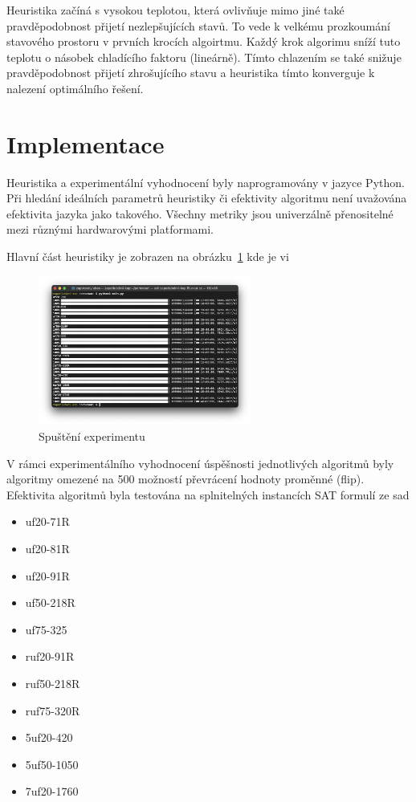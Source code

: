 \documentclass[twoside,twocolumn]{article}
\begin{document}
    Heuristika začíná s vysokou teplotou, která ovlivňuje mimo jiné také pravděpodobnost přijetí nezlepšujících stavů.
    To vede k velkému prozkoumání stavového prostoru v prvních krocích algoirtmu.
    Každý krok algorimu sníží tuto teplotu o násobek chladícího faktoru (lineárně).
    Tímto chlazením se také snižuje pravděpodobnost přijetí zhrošujícího stavu a heuristika tímto konverguje k nalezení
    optimálního řešení.



    \section{Implementace}

    Heuristika a experimentální vyhodnocení byly naprogramovány v jazyce Python.
    Při hledání ideálních parametrů heuristiky či efektivity algoritmu není uvažována efektivita jazyka jako takového.
    Všechny metriky jsou univerzálně přenositelné mezi různými hardwarovými platformami.

    Hlavní část heuristiky je zobrazen na obrázku~\ref{fig:main-part} kde je vi

    \begin{figure}
        \centering
        \includegraphics[width=7cm]{images/generation}
        \caption{Spuštění experimentu}
        \label{fig:main-part}
    \end{figure}

    V rámci experimentálního vyhodnocení úspěšnosti jednotlivých algoritmů byly algoritmy omezené na 500 možností převrácení hodnoty proměnné (flip).
    Efektivita algoritmů byla testována na splnitelných instancích SAT formulí ze sad

    \begin{itemize}
        \item uf20-71R
        \item uf20-81R
        \item uf20-91R
        \item uf50-218R
        \item uf75-325
        \item ruf20-91R
        \item ruf50-218R
        \item ruf75-320R
        \item 5uf20-420
        \item 5uf50-1050
        \item 7uf20-1760
    \end{itemize}
\end{document}
